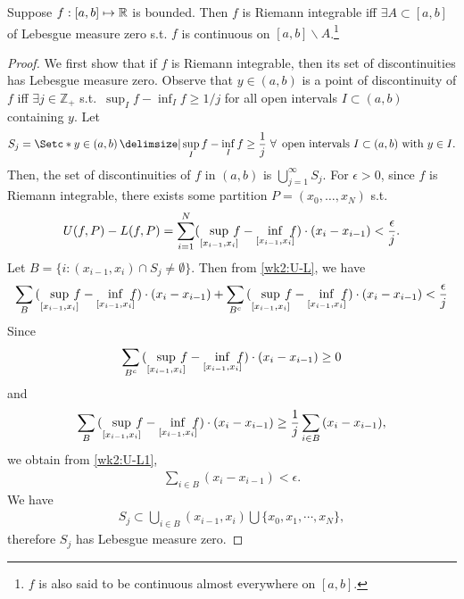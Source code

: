 \documentclass[12pt]{article}
\begin{document}
\begin{Theorem}\label{thm:RiemannIntegrable}
Suppose $f:[a,b]\mapsto \mathbb{R}$ is bounded. Then $f$ is Riemann integrable iff $\exists A \subset [a,b]$ of Lebesgue measure zero s.t. $f$ is continuous on $[a,b]\backslash A$.\footnote{$f$ is also said to be continuous almost everywhere on $[a,b]$.}
\end{Theorem}
\begin{proof}
We first show that if $f$ is Riemann integrable, then its set of discontinuities has Lebesgue measure zero. Observe that $y \in (a,b)$ is a point of discontinuity of $f$ iff $\exists j \in \mathbb{Z}_{+}$ s.t.\ $\sup_{I}{f}-\inf_{I}{f}\geq 1/j$ for all open intervals $I \subset (a,b)$ containing $y$. Let 
\begin{align*}
S_j=\set*{y\in(a,b) \given \sup_I{f}-\inf_I{f}\geq \frac{1}{j}\ \forall\ \text{open intervals $I\subset(a,b)$ with $y\in I$}}.
\end{align*}
Then, the set of discontinuities of $f$ in $(a,b)$ is $\bigcup^{\infty}_{j=1}{S_j}$. For $\epsilon >0$, since $f$ is Riemann integrable, there exists some partition $P=(x_0,\ldots,x_N)$ s.t.
\begin{align}\label{wk2:U-L}
U(f,P)-L(f,P)=\sum_{i=1}^N (\sup_{[x_{i-1},x_i]}\mathllap{f}-\inf_{[x_{i-1},x_i]}\mathllap{f})\cdot(x_i-x_{i-1}) < \frac{\epsilon}{j}.
\end{align}
Let $B=\{i:(x_{i-1},x_i)\cap S_j\neq\emptyset\}$. Then from \cref{wk2:U-L}, we have
\begin{align}\label{wk2:U-L1}
\sum_{B}{(\sup_{[x_{i-1},x_i]}\mathllap{f}-\inf_{[x_{i-1},x_i]}\mathllap{f})\cdot(x_i-x_{i-1})}+\sum_{B^c}{(\sup_{[x_{i-1},x_i]}\mathllap{f}-\inf_{[x_{i-1},x_i]}\mathllap{f})\cdot(x_i-x_{i-1})}<\frac{\epsilon}{j}
\end{align}
Since 
\begin{align*}
\sum_{B^c}{(\sup_{[x_{i-1},x_i]}\mathllap{f}-\inf_{[x_{i-1},x_i]}\mathllap{f})\cdot(x_i-x_{i-1})}\geq 0
\end{align*}
and
\begin{align*}
\sum_{B}{(\sup_{[x_{i-1},x_i]}\mathllap{f}-\inf_{[x_{i-1},x_i]}\mathllap{f})\cdot(x_i-x_{i-1})}\geq \frac{1}{j}\sum_{i\in B}{(x_i-x_{i-1})},
\end{align*}
we obtain from \cref{wk2:U-L1},
\begin{align*}
\sum_{i\in B}{(x_i-x_{i-1})}<\epsilon.
\end{align*}
We have
\begin{align*}
S_j\subset \bigcup_{i\in B}(x_{i-1},x_i)\bigcup\{x_0,x_1,\cdots,x_N\},
\end{align*}
therefore $S_j$ has Lebesgue measure zero.


\end{proof}
\end{document}
